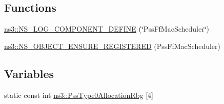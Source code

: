 \subsection*{Functions}
\begin{DoxyCompactItemize}
\item 
\hyperlink{namespacens3_a5ffb69d7028ca218752bafa0b2617de9}{ns3\+::\+N\+S\+\_\+\+L\+O\+G\+\_\+\+C\+O\+M\+P\+O\+N\+E\+N\+T\+\_\+\+D\+E\+F\+I\+NE} (\char`\"{}Pss\+Ff\+Mac\+Scheduler\char`\"{})
\item 
\hyperlink{namespacens3_a7a5913972d03556f79ff3c2b959f4047}{ns3\+::\+N\+S\+\_\+\+O\+B\+J\+E\+C\+T\+\_\+\+E\+N\+S\+U\+R\+E\+\_\+\+R\+E\+G\+I\+S\+T\+E\+R\+ED} (Pss\+Ff\+Mac\+Scheduler)
\end{DoxyCompactItemize}
\subsection*{Variables}
\begin{DoxyCompactItemize}
\item 
static const int \hyperlink{namespacens3_aca0561367fba73fda0ca46a7b2b0cbcf}{ns3\+::\+Pss\+Type0\+Allocation\+Rbg} \mbox{[}4\mbox{]}
\end{DoxyCompactItemize}
